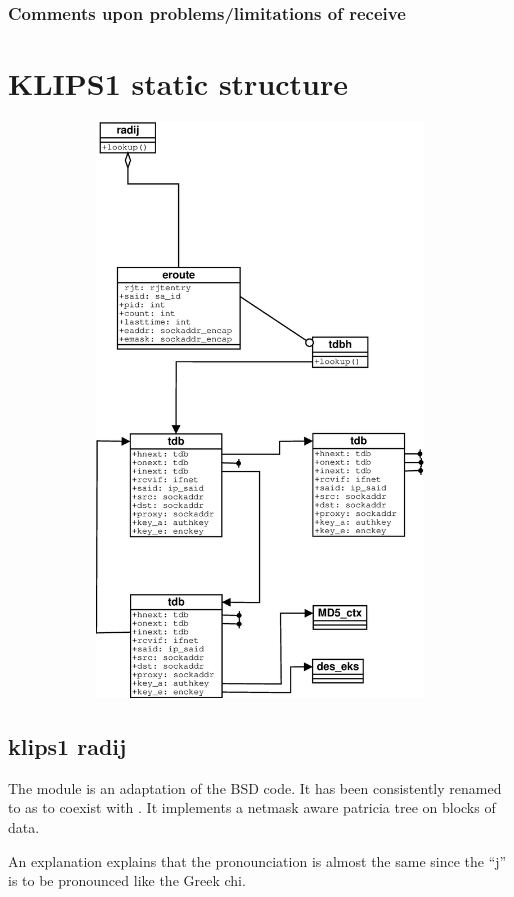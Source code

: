 \subsubsection{Comments upon problems/limitations of receive}

\section{KLIPS1 static structure}

\begin{figure}
\includegraphics[height=6in,width=6in]{diagrams/klips1_tdb.eps} 
\label{KLIPS1 structures}
\end{figure}

\subsection{klips1 radij}

The  module is an adaptation of the BSD  code. It
has been consistently renamed to as to coexist with . It
implements a netmask aware patricia tree on blocks of data.

An explanation explains that the pronounciation is almost the same since the
``j'' is to be pronounced like the Greek chi.

